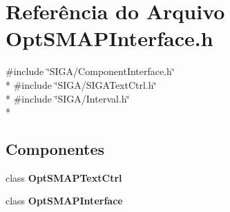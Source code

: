 \section{Referência do Arquivo Opt\+S\+M\+A\+P\+Interface.\+h}
\label{_opt_s_m_a_p_interface_8h}
{\ttfamily \#include \char`\"{}S\+I\+G\+A/\+Component\+Interface.\+h\char`\"{}}\\*
{\ttfamily \#include \char`\"{}S\+I\+G\+A/\+S\+I\+G\+A\+Text\+Ctrl.\+h\char`\"{}}\\*
{\ttfamily \#include \char`\"{}S\+I\+G\+A/\+Interval.\+h\char`\"{}}\\*
\subsection*{Componentes}
\begin{DoxyCompactItemize}
\item 
class {\bf Opt\+S\+M\+A\+P\+Text\+Ctrl}
\item 
class {\bf Opt\+S\+M\+A\+P\+Interface}
\end{DoxyCompactItemize}
